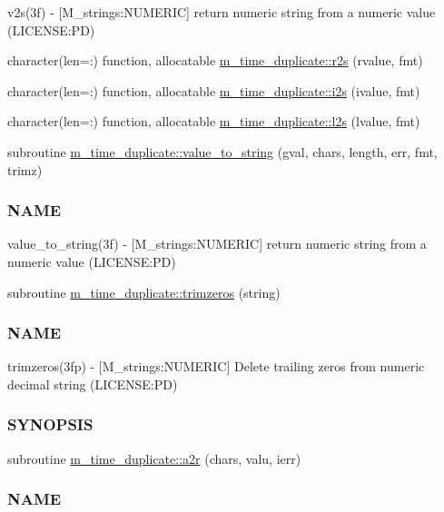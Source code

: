 \begin{DoxyCompactItemize}
\begin{DoxyCompactList}
v2s(3f) -\/ \mbox{[}M\+\_\+strings\+:N\+U\+M\+E\+R\+IC\mbox{]} return numeric string from a numeric value (L\+I\+C\+E\+N\+SE\+:PD) \end{DoxyCompactList}\item 
character(len=\+:) function, allocatable \mbox{\hyperlink{namespacem__time__duplicate_a9d1f96975ddf101c13c2f7f0dbf92a02}{m\+\_\+time\+\_\+duplicate\+::r2s}} (rvalue, fmt)
\item 
character(len=\+:) function, allocatable \mbox{\hyperlink{namespacem__time__duplicate_a7570c5a3b71c4ea4f376a38b285ccbd8}{m\+\_\+time\+\_\+duplicate\+::i2s}} (ivalue, fmt)
\item 
character(len=\+:) function, allocatable \mbox{\hyperlink{namespacem__time__duplicate_a4bd5e96c3ed16383c576c4e362c16b82}{m\+\_\+time\+\_\+duplicate\+::l2s}} (lvalue, fmt)
\item 
subroutine \mbox{\hyperlink{namespacem__time__duplicate_ab836a3b7c441e5b324639db734b7de9f}{m\+\_\+time\+\_\+duplicate\+::value\+\_\+to\+\_\+string}} (gval, chars, length, err, fmt, trimz)
\begin{DoxyCompactList}\small\item\em \subsubsection*{N\+A\+ME}

value\+\_\+to\+\_\+string(3f) -\/ \mbox{[}M\+\_\+strings\+:N\+U\+M\+E\+R\+IC\mbox{]} return numeric string from a numeric value (L\+I\+C\+E\+N\+SE\+:PD) \end{DoxyCompactList}\item 
subroutine \mbox{\hyperlink{namespacem__time__duplicate_ae5ec641c9bdaa5d9377e47310e2165be}{m\+\_\+time\+\_\+duplicate\+::trimzeros}} (string)
\begin{DoxyCompactList}\small\item\em \subsubsection*{N\+A\+ME}

trimzeros(3fp) -\/ \mbox{[}M\+\_\+strings\+:N\+U\+M\+E\+R\+IC\mbox{]} Delete trailing zeros from numeric decimal string (L\+I\+C\+E\+N\+SE\+:PD) \subsubsection*{S\+Y\+N\+O\+P\+S\+IS}\end{DoxyCompactList}\item 
subroutine \mbox{\hyperlink{namespacem__time__duplicate_a9e2a87974ffb9b81dcfb0ecee076180f}{m\+\_\+time\+\_\+duplicate\+::a2r}} (chars, valu, ierr)
\begin{DoxyCompactList}\small\item\em \subsubsection*{N\+A\+ME}


\end{DoxyCompactList}
\end{DoxyCompactItemize}
